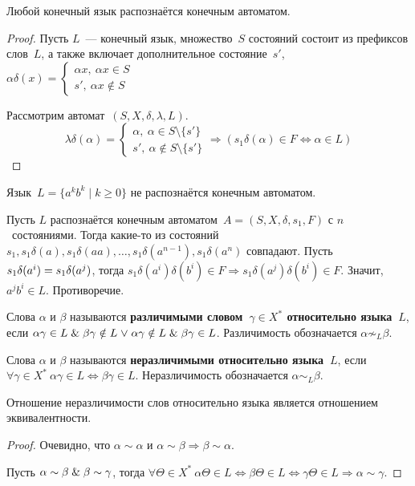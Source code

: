 \begin{statement}
Любой конечный язык распознаётся конечным автоматом.
\end{statement}
\begin{proof}
Пусть $L$~--- конечный язык, множество~$S$ состояний состоит из префиксов слов~$L$, а также включает дополнительное состояние~$s'$, $\alpha \delta(x) =
\begin{cases}
\alpha x, \ \alpha x \in S \\
s', \ \alpha x \notin S
\end{cases}$

Рассмотрим автомат~$(S, X, \delta, \lambda, L)$.
\begin{equation*}
\lambda \delta(\alpha) =
\begin{cases}
\alpha, \ \alpha \in S \setminus \{ s' \} \\
s', \ \alpha \notin S \setminus \{ s' \}
\end{cases} \Rightarrow
(s_1 \delta(\alpha) \in F \Leftrightarrow \alpha \in L)
\end{equation*}
\end{proof}

\begin{theorem}
Язык~$L = \{ a^k b^k \mid k \geqslant 0 \}$ не распознаётся конечным автоматом.
\end{theorem}
\begin{proofcontra}
Пусть $L$ распознаётся конечным автоматом~$A = (S, X, \delta, s_1, F)$ с $n$~состояниями.
Тогда какие-то из состояний $s_1, s_1 \delta(a), s_1 \delta(aa), \ldots, s_1 \delta(a^{n-1}), s_1 \delta(a^n)$ совпадают.
Пусть $s_1 \delta(a^i) \opbr= s_1 \delta(a^j)$, тогда $s_1 \delta(a^i) \delta(b^i) \in F \Rightarrow
s_1 \delta(a^j) \delta(b^i) \in F$.
Значит, $a^j b^i \in L$.
Противоречие.
\end{proofcontra}

Слова $\alpha$ и $\beta$ называются \textbf{различимыми словом~$\gamma \in X^*$ относительно языка~$L$}, если $\alpha \gamma \in L \opbr\lAnd \beta \gamma \notin L \opbr\lOr \alpha \gamma \notin L \opbr\lAnd \beta \gamma \in L$.
Различимость обозначается $\alpha \not\sim_L \beta$.

Слова $\alpha$ и $\beta$ называются \textbf{неразличимыми относительно языка~$L$}, если $\forall \gamma \in X^* \ \alpha \gamma \in L \Leftrightarrow \beta \gamma \in L$.
Неразличимость обозначается $\alpha \sim_L \beta$.

\begin{statement}
Отношение неразличимости слов относительно языка является отношением эквивалентности.
\end{statement}
\begin{proof}
Очевидно, что $\alpha \sim \alpha$ и $\alpha \sim \beta \Rightarrow \beta \sim \alpha$.

Пусть $\alpha \sim \beta \mathrel{\&} \beta \sim \gamma$, тогда $\forall \Theta \in X^* \ 
\alpha \Theta \in L \Leftrightarrow
\beta \Theta \in L \Leftrightarrow
\gamma \Theta \in L \Rightarrow
\alpha \sim \gamma$.
\end{proof}

